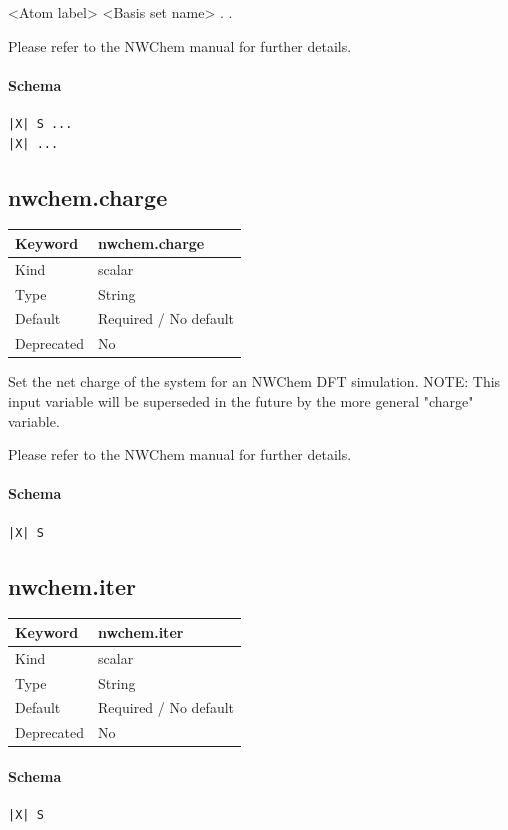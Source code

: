 \documentclass[11pt]{article}
\begin{document}
 <Atom label> <Basis set name>
  .
  .

 Please refer to the NWChem manual for further details.

\paragraph{Schema}
\begin{Verbatim}
|X| S ...
|X| ...
\end{Verbatim}

\subsection{nwchem.charge}
\label{kw:nwchem-charge}
\begin{longtable}{|p{1.5in}|p{4.5in}|}
\hline
Keyword & nwchem.charge \\
\hline
Kind & scalar \\
\hline
Type & String \\
\hline
Default & Required / No default \\
\hline
Deprecated & No \\
\hline
\end{longtable}
 Set the net charge of the system for an NWChem DFT simulation.
 NOTE: This input variable will be superseded in the future by the more
 general "charge" variable.

 Please refer to the NWChem manual for further details.

\paragraph{Schema}
\begin{Verbatim}
|X| S
\end{Verbatim}

\subsection{nwchem.iter}
\label{kw:nwchem-iter}
\begin{longtable}{|p{1.5in}|p{4.5in}|}
\hline
Keyword & nwchem.iter \\
\hline
Kind & scalar \\
\hline
Type & String \\
\hline
Default & Required / No default \\
\hline
Deprecated & No \\
\hline
\end{longtable}
\paragraph{Schema}
\begin{Verbatim}
|X| S
\end{Verbatim}
\end{document}
